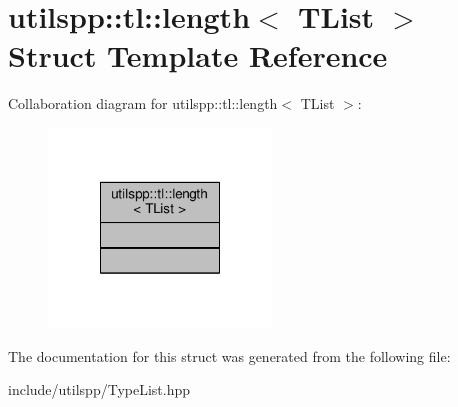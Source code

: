 \hypertarget{structutilspp_1_1tl_1_1length}{\section{utilspp\-:\-:tl\-:\-:length$<$ T\-List $>$ Struct Template Reference}
\label{structutilspp_1_1tl_1_1length}
}


Collaboration diagram for utilspp\-:\-:tl\-:\-:length$<$ T\-List $>$\-:\nopagebreak
\begin{figure}[H]
\begin{center}
\leavevmode
\includegraphics[width=168pt]{structutilspp_1_1tl_1_1length__coll__graph}
\end{center}
\end{figure}


The documentation for this struct was generated from the following file\-:\begin{DoxyCompactItemize}
\item 
include/utilspp/Type\-List.\-hpp\end{DoxyCompactItemize}
